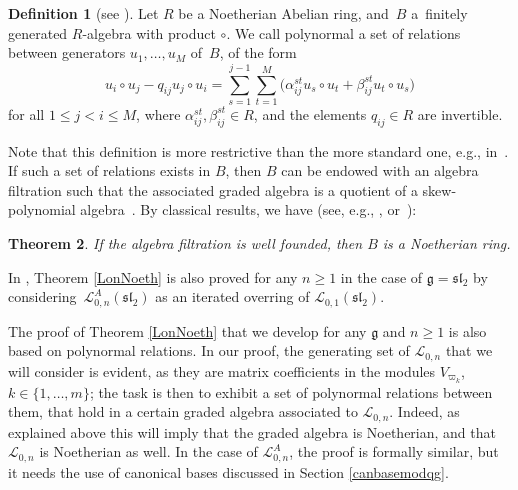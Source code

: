 \documentclass[pdftex]{sigma}
\numberwithin{equation}{section}
\newtheorem{teo}{Theorem}[section]
\theoremstyle{definition}
\newtheorem{defi}[teo]{Definition}
\newcommand{\Ll}{{\mathcal L}}
\begin{document}
\begin{defi}[{see \cite[Proposition 3.133]{VY}}] Let $R$ be a Noetherian Abelian ring, and~$B$ a~finitely generated $R$-algebra with product $\circ$. We call polynormal a set of relations between generators $u_1,\dots,u_M$ of~$B$, of the form{\samepage
\begin{equation}\label{echangegrad++}
u_i\circ u_j - q_{ij} u_j\circ u_i = \sum_{s=1}^{j-1}\sum_{t=1}^M \bigl(\alpha_{ij}^{st} u_s\circ u_t + \beta_{ij}^{st} u_t\circ u_s\bigr)
\end{equation}
for all $1\leq j<i\leq M$, where $\alpha_{ij}^{st}, \beta_{ij}^{st} \in R$, and the elements $q_{ij}\in R$ are invertible.}
\end{defi}
Note that this definition is more restrictive than the more standard one, e.g., in~\cite[Definition~II.4.1]{BG}. If such a set of relations exists in $B$, then $B$ can be endowed with an algebra filtration such that the associated graded algebra is a quotient of a skew-polynomial algebra~\cite[Proposition I.8.17]{BG}. By classical results, we have (see, e.g., \cite[Theorems~1.2.9, 1.6.9 and Examples~1.6.11]{MC-R}, or~\cite[Lemmas~3.130--3.131]{VY}):

\begin{teo} If the algebra filtration is well founded, then $B$ is a Noetherian ring.
\end{teo}

In \cite{DomLen}, Theorem \ref{LonNoeth} is also proved for any $n\geq 1$ in the case of $\mathfrak{g}={\mathfrak{sl}_2}$ by considering~$\Ll_{0,n}^A({\mathfrak{sl}_2})$ as an iterated overring of ${\mathcal L}_{0,1}({\mathfrak{sl}_2})$.


The proof of Theorem \ref{LonNoeth} that we develop for any $\mathfrak{g}$ and $n\geq 1$ is also based on polynormal relations. In our proof, the generating set of $\Ll_{0,n}$ that we will consider is evident, as they are matrix coefficients in the modules $V_{\varpi_k}$, $k\in\{1,\dots,m\}$; the task is then to exhibit a set of polynormal relations between them, that hold in a certain graded algebra associated to $\Ll_{0,n}$. Indeed, as explained above this will imply that the graded algebra is Noetherian, and that $\Ll_{0,n}$ is Noetherian as well. In the case of $\Ll_{0,n}^A$, the proof is formally similar, but it needs the use of canonical bases discussed in Section \ref{canbasemodqg}.
\end{document}
